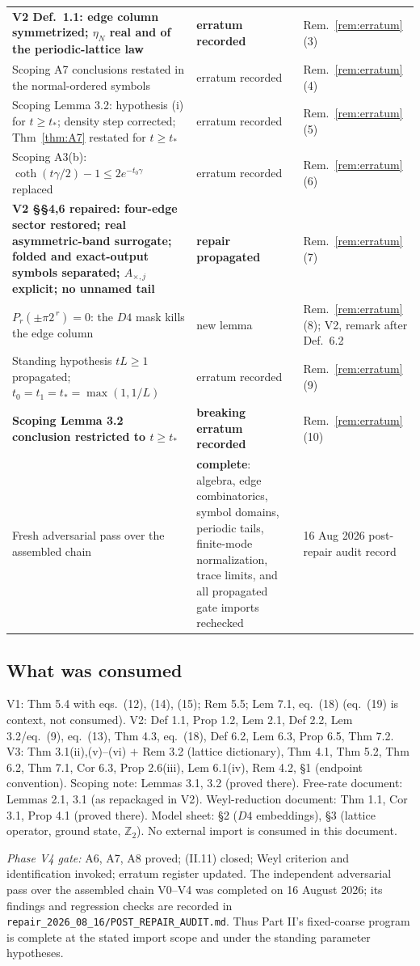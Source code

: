 \documentclass[11pt,a4paper]{article}
\theoremstyle{plain}
\theoremstyle{definition}
\newcommand{\Z}{\mathbb{Z}}
\begin{document}
\begin{longtable}{P{6.1cm}P{2.1cm}P{5.5cm}}
\textbf{V2 Def.\ 1.1: edge column symmetrized; $\eta_N$ real and of the
periodic-lattice law} & \textbf{erratum recorded} & Rem.~\ref{rem:erratum}(3) \\
Scoping A7 conclusions restated in the normal-ordered symbols & erratum recorded &
Rem.~\ref{rem:erratum}(4) \\
Scoping Lemma 3.2: hypothesis (i) for $t\ge t_*$; density step corrected;
Thm~\ref{thm:A7} restated for $t\ge t_*$ & erratum recorded &
Rem.~\ref{rem:erratum}(5) \\
Scoping A3(b): $\coth(t\gamma/2)-1\le2e^{-t_0\gamma}$ replaced & erratum recorded &
Rem.~\ref{rem:erratum}(6) \\
\textbf{V2 \S\S4,6 repaired: four-edge sector restored; real asymmetric-band
surrogate; folded and exact-output symbols separated; $A_{\times,j}$ explicit;
no unnamed tail} &
\textbf{repair propagated} &
Rem.~\ref{rem:erratum}(7) \\
$P_r(\pm\pi2^{\,r})=0$: the $D4$ mask kills the edge column & new lemma &
Rem.~\ref{rem:erratum}(8); V2, remark after Def.\ 6.2 \\
Standing hypothesis $tL\ge1$ propagated; $t_0=t_1=t_*=\max(1,1/L)$ &
erratum recorded & Rem.~\ref{rem:erratum}(9) \\
\textbf{Scoping Lemma 3.2 conclusion restricted to $t\ge t_*$} &
\textbf{breaking erratum recorded} & Rem.~\ref{rem:erratum}(10) \\
Fresh adversarial pass over the assembled chain & \textbf{complete}: algebra,
edge combinatorics, symbol domains, periodic tails, finite-mode normalization,
trace limits, and all propagated gate imports rechecked & 16 Aug 2026 post-repair
audit record \\
\bottomrule
\end{longtable}

\subsection*{What was consumed}

V1: Thm 5.4 with eqs.\ (12), (14), (15); Rem 5.5; Lem 7.1, eq.\ (18)
(eq.\ (19) is context, not consumed).
V2: Def 1.1, Prop 1.2, Lem 2.1, Def 2.2, Lem 3.2/eq.\ (9), eq.\ (13),
Thm 4.3, eq.\ (18), Def 6.2, Lem 6.3, Prop 6.5, Thm 7.2.
V3: Thm 3.1(ii),(v)--(vi) $+$ Rem 3.2 (lattice dictionary), Thm 4.1,
Thm 5.2, Thm 6.2, Thm 7.1, Cor 6.3, Prop 2.6(iii), Lem 6.1(iv), Rem 4.2,
\S1 (endpoint convention).
Scoping note: Lemmas 3.1, 3.2 (proved there).
Free-rate document: Lemmas 2.1, 3.1 (as repackaged in V2).
Weyl-reduction document: Thm 1.1, Cor 3.1, Prop 4.1 (proved there).
Model sheet: \S2 ($D4$ embeddings), \S3 (lattice operator, ground state,
$\Z_2$). No external import is consumed in this document.

\medskip
\noindent\emph{Phase V4 gate:} A6, A7, A8 proved; (II.11) closed;
Weyl criterion and identification invoked; erratum register updated.
The independent adversarial pass over the assembled chain V0--V4 was
completed on 16 August 2026; its findings and regression checks are recorded
in \texttt{repair\_2026\_08\_16/POST\_REPAIR\_AUDIT.md}.  Thus Part II's
fixed-coarse program is complete at the stated import scope and under the
standing parameter hypotheses.
\end{document}
